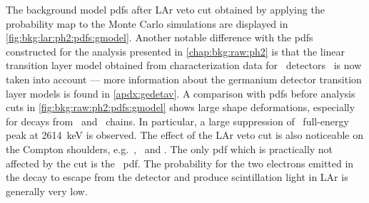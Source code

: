 The background model pdfs after LAr veto cut obtained by applying the probability map to
the Monte Carlo simulations are displayed in \cref{fig:bkg:lar:ph2:pdfs:gmodel}. Another
notable difference with the pdfs constructed for the analysis presented in
\cref{chap:bkg:raw:ph2} is that the linear transition layer model obtained from
characterization data for \bege\ detectors~\cite{Lehnert2016} is now taken into account
--- more information about the germanium detector transition layer models is found in
\cref{apdx:gedetav}. A comparison with pdfs before analysis cuts in
\cref{fig:bkg:raw:ph2:pdfs:gmodel} shows large shape deformations, especially for decays
from \Uh\ and \Thh\ chains. In particular, a large suppression of \Tl\ full-energy peak at
2614~keV is observed. The effect of the LAr veto cut is also noticeable on the Compton
shoulders, e.g.~\kvn, \kvz\ and \Co. The only pdf which is practically not affected by the
cut is the \nnbb\ pdf. The probability for the two electrons emitted in the decay to
escape from the detector and produce scintillation light in LAr is generally very low.

